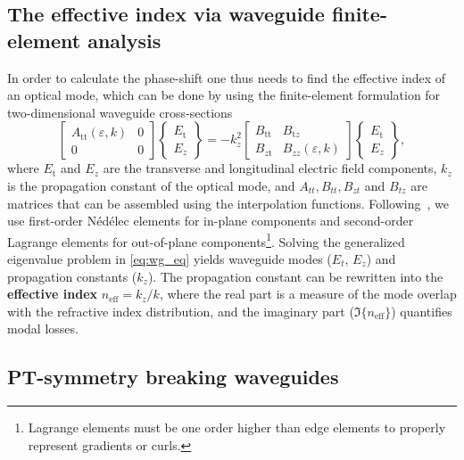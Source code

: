 \subsection*{The effective index via waveguide finite-element analysis}

In order to calculate the phase-shift one thus needs to find the effective index of an optical mode, which can be done by 
using the finite-element formulation for two-dimensional waveguide cross-sections~\cite{jin}
\begin{equation}\label{eq:wg_eq}
    \left[\begin{array}{cc}
    A_{\text{tt}}(\varepsilon,k) & 0 \\
    0 & 0
    \end{array}\right]
    \left\{\begin{array}{l}
    E_{\text{t}} \\
    E_z
    \end{array}\right\}
    = -k_z^2
    \left[\begin{array}{cc}
    B_{\text{tt}} & B_{\text{t} z} \\
    B_{z \text{t}} & B_{z z}(\varepsilon,k)
    \end{array}\right]
    \left\{\begin{array}{c}
    E_{\text{t}} \\
    E_z
    \end{array}\right\},
    \end{equation}
where $E_{\text{t}}$ and $E_z$ are the transverse and longitudinal electric field components, $k_z$ is the propagation constant of the optical mode, and $A_{tt}, B_{tt},
B_{zt}$ and $B_{tz}$ are matrices that can be assembled using the interpolation functions. Following~\cite{jin}, we use first-order Nédélec elements for in-plane components and 
second-order Lagrange elements for out-of-plane components\footnote{Lagrange elements must be one order higher than edge elements to properly represent gradients or curls.}. 
Solving the generalized eigenvalue problem in \eqref{eq:wg_eq} yields waveguide modes ($E_t$, $E_z$) and propagation constants ($k_z$). The propagation constant can be rewritten into the \textbf{effective index} $n_\text{eff} = k_z / k$,
 where the real part is a measure of the mode overlap with the refractive index distribution, and the imaginary part ($\Im\{n_\text{eff}\}$) quantifies modal losses. 

 \subsection*{PT-symmetry breaking waveguides}

